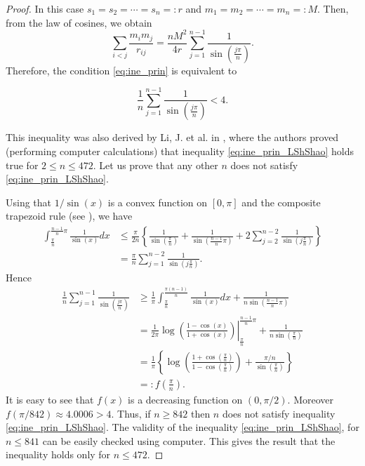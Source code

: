 \documentclass[smallcondensed]{svjour3}
\begin{document}
\begin{proof}
In this case $s_1=s_2=\cdots=s_n=:r$ and $m_1=m_2=\cdots=m_n=:M$. Then, from the law of cosines, we obtain
\[
 \sum_{i<j}\frac{m_im_j}{r_{ij}}=\frac{nM^2}{4r}\sum_{j=1}^{n-1}\frac{1}{\sin\left(\frac{j\pi}{n}\right)}.
\]
Therefore, the condition \eqref{eq:ine_prin} is equivalent to

\begin{equation}\label{eq:ine_prin_LShShao}
  \frac1n\sum_{j=1}^{n-1}\frac{1}{\sin\left(\frac{j\pi}{n}\right)}<4.
\end{equation}

This inequality was also derived by Li, J. et al. in \cite{li2013characterization}, where the authors proved (performing computer calculations) that inequality \eqref{eq:ine_prin_LShShao} holds true for $2\leq n\leq 472$. Let us prove that any other $n$ does not satisfy \eqref{eq:ine_prin_LShShao}.


Using that $1/\sin (x)$ is a convex function on $[0,\pi]$ and the composite trapezoid rule (see \cite{kincaid1991numerical}), we have 
\[
\begin{split}
 \int_{\frac{\pi}{n}}^{\frac{n-1}{n}\pi}\frac{1}{\sin (x)}dx&\leq \frac{\pi}{2n}\left\{ \frac{1}{\sin(\frac{\pi}{n})} + \frac{1}{\sin(\frac{n-1}{n}\pi)} +2\sum_{j=2}^{n-2}\frac{1}{\sin(j\frac{\pi}{n})} \right\}\\
 &=\frac{\pi}{n}\sum_{j=1}^{n-2}\frac{1}{\sin(j\frac{\pi}{n})}.
\end{split}
\]
Hence
\[
\begin{split}
 \frac1n \sum_{j=1}^{n-1}\frac{1}{\sin\left(\frac{j\pi}{n}\right)}&\geq \frac{1}{\pi}\int_{\frac{\pi}{n}}^{\frac{\pi(n-1)}{n}}\frac{1}{\sin (x)}dx+\frac{1}{n\sin\left(\frac{n-1}{n}\pi\right)}\\
 &=\left.\frac{1}{2\pi}\log \left( \frac{1-\cos(x)}{1+\cos(x)}\right)\right|_{\frac{\pi}{n}}^{\frac{n-1}{n}\pi}+\frac{1}{n\sin\left(\frac{\pi}{n}\right)}\\
 &=\frac{1}{\pi}\left\{\log \left(\frac{1+\cos(\frac{\pi}{n})}{1-\cos(\frac{\pi}{n})}\right)+\frac{\pi/n}{\sin\left(\frac{\pi}{n}\right)}\right\}\\
 &=:f\left(\frac{\pi}{n} \right).
 \end{split}
\]
It is easy to see that $f(x)$ is a decreasing function on $(0,\pi/2)$. Moreover $f(\pi/842)\approx 4.0006>4$. Thus, if $n\geq 842$ then $n$ does not satisfy inequality \eqref{eq:ine_prin_LShShao}. The validity of the inequality \eqref{eq:ine_prin_LShShao}, for $n\leq 841$ can be easily checked using computer. This gives the result that the inequality holds only for $n \leq 472$.
\end{proof}
\end{document}
